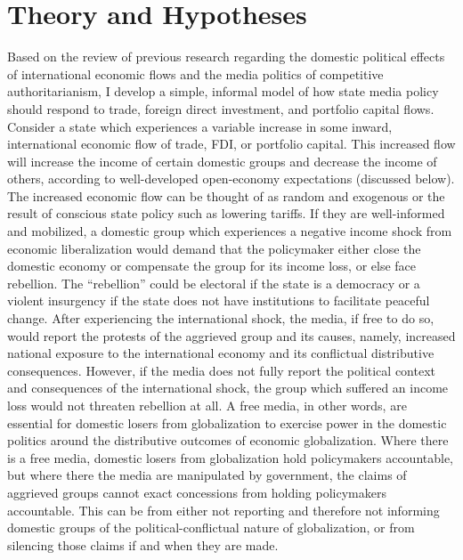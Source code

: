 \documentclass[12pt,a4paper]{article}\usepackage[]{graphicx}\usepackage[]{color}
\begin{document}
\section{Theory and Hypotheses}

Based on the review of previous research regarding the domestic political effects of international economic flows and the media politics of competitive authoritarianism, I develop a simple, informal model of how state media policy should respond to trade, foreign direct investment, and portfolio capital flows. Consider a state which experiences a variable increase in some inward, international economic flow of trade, FDI, or portfolio capital. This increased flow will increase the income of certain domestic groups and decrease the income of others, according to well-developed open-economy expectations (discussed below). The increased economic flow can be thought of as random and exogenous or the result of conscious state policy such as lowering tariffs. If they are well-informed and mobilized, a domestic group which experiences a negative income shock from economic liberalization would demand that the policymaker either close the domestic economy or compensate the group for its income loss, or else face rebellion. The “rebellion” could be electoral if the state is a democracy or a violent insurgency if the state does not have institutions to facilitate peaceful change. After experiencing the international shock, the media, if free to do so, would report the protests of the aggrieved group and its causes, namely, increased national exposure to the international economy and its conflictual distributive consequences. However, if the media does not fully report the political context and consequences of the international shock, the group which suffered an income loss would not threaten rebellion at all. A free media, in other words, are essential for domestic losers from globalization to exercise power in the domestic politics around the distributive outcomes of economic globalization. Where there is a free media, domestic losers from globalization hold policymakers accountable, but where there the media are manipulated by government, the claims of aggrieved groups cannot exact concessions from holding policymakers accountable. This can be from either not reporting and therefore not informing domestic groups of the political-conflictual nature of globalization, or from silencing those claims if and when they are made.
\end{document}
